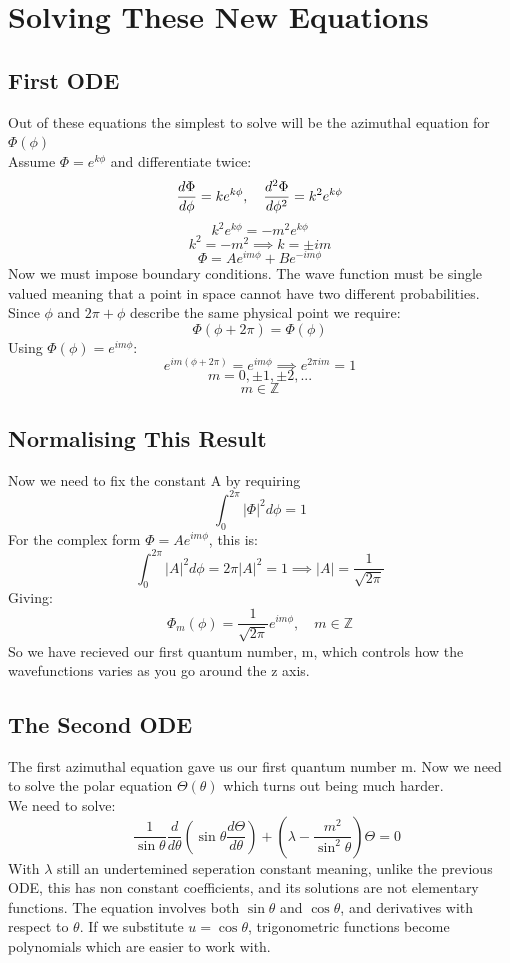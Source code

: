 \documentclass{article}
\begin{document}
\section{Solving These New Equations}
\subsection{First ODE}
Out of these equations the simplest to solve will be the azimuthal equation for $\Phi(\phi)$\\
Assume $\Phi=e^{k\phi}$ and differentiate twice:
\[
\frac{d\Phi}{d\phi} =ke^{k\phi}, \quad \frac{d^2\Phi}{d\phi^2} =k^2e^{k\phi}\\
\]
\[
k^2e^{k\phi} = -m^2e^{k\phi}
\]
\[
k^2 = -m^2 \implies k=\pm im
\]
\[
 \Phi = Ae^{im\phi} + Be^{-im\phi}
\]
Now we must impose boundary conditions. The wave function must be single valued meaning that a point in space cannot have two different probabilities. Since $\phi$ and $2\pi + \phi$ describe the same physical point we require:
\[
\Phi(\phi + 2\pi) = \Phi (\phi)
\]
Using $\Phi(\phi)=e^{im\phi}$:
\[
e^{im(\phi +2\pi)} = e^{im\phi} \implies e^{2\pi im} = 1
\]
\[m =0,\pm1,\pm2,...\]
\[
    \boxed{m\in \mathbb{Z}}
\]
\subsection{Normalising This Result}
Now we need to fix the constant A by requiring
\[
\int^{2\pi}_0 |\Phi|^2d\phi = 1
\]
For the complex form $\Phi = Ae^{im\phi}$, this is:
\[
\int^{2\pi}_0 |A|^2d\phi = 2\pi|A|^2 = 1 \implies |A| = \frac{1}{\sqrt{2\pi}}
\]
Giving:
\[
\boxed{\Phi_m(\phi) = \frac{1}{\sqrt{2\pi}}e^{im\phi}, \quad m\in \mathbb{Z}}
\]
So we have recieved our first quantum number, m, which controls how the wavefunctions varies as you go around the z axis.
\newpage
\subsection{The Second ODE}
The first azimuthal equation gave us our first quantum number m. Now we need to solve the polar equation $\Theta(\theta)$ which turns out being much harder.\\
We need to solve:
\[
\quad \frac{1}{\sin\theta}\frac{d}{d\theta}\!\left(\sin\theta\frac{d\Theta}{d\theta}\right)
  + \left(\lambda - \frac{m^2}{\sin^2\theta}\right)\Theta = 0
  \]
With $\lambda$ still an undertemined seperation constant meaning, unlike the previous ODE, this has non constant coefficients, and its solutions are not elementary functions. The equation involves both $\sin\theta$ and $\cos\theta$, and derivatives with respect to $\theta$. If we substitute $u = \cos\theta$, trigonometric functions become polynomials which are easier to work with.
\end{document}

